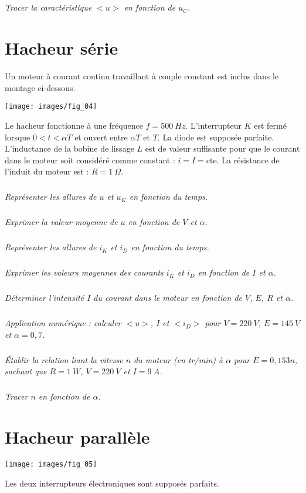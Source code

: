 \documentclass[10pt,fleqn]{article} %
\begin{document}
\begin{multicols}{2}
\begin{multicols}{2}
\subparagraph{}\textit{Tracer la caractéristique $< u >$ en fonction de $u_C$.}



\newpage

\section*{Hacheur série}

\setcounter{exo}{0}
Un moteur à courant continu travaillant à couple constant est inclus dans le montage ci-dessous.


\begin{center}
\texttt{[image: images/fig\_04]}
\end{center}


Le hacheur fonctionne à une fréquence $f = \SI{500}{Hz}$.
L’interrupteur $K$ est fermé lorsque $0 < t < \alpha T$ et ouvert entre $\alpha T$ et $T$.
La diode est supposée parfaite.
L'inductance de la bobine de lissage $L$ est de valeur suffisante pour que le courant dans le
moteur soit considéré comme constant : $i= I = \text{cte}$.
La résistance de l’induit du moteur est : $R = \SI{1}{\Omega}$.

\subparagraph{}\textit{ Représenter les allures de $u$ et $u_K$ en fonction du temps.}
\subparagraph{}\textit{ Exprimer la valeur moyenne de $u$ en fonction de $V$ et $\alpha$.}
\subparagraph{}\textit{ Représenter les allures de $i_K$ et $i_D$ en fonction du temps.}
\subparagraph{}\textit{ Exprimer les valeurs moyennes des courants $i_K$ et $i_D$ en fonction de $I$ et $\alpha$.}
\subparagraph{}\textit{ Déterminer l'intensité $I$ du courant dans le moteur en fonction de $V$, $E$, $R$ et $\alpha$.}

\subparagraph{}\textit{ Application numérique : calculer $< u >$, $I$ et $< i_D >$ pour $V = \SI{220}{V}$, $E = \SI{145}{V}$ et $\alpha = 0,7$.}

\subparagraph{}\textit{ Établir la relation liant la vitesse $n$ du moteur (en tr/min) à $\alpha$ pour $E = 0,153 n$, sachant que $R = \SI{1}{W}$, $V = \SI{220}{V}$ et $I =\SI{9}{A}$.}
\subparagraph{}\textit{ Tracer $n$ en fonction de $\alpha$.}

\newpage

\section*{Hacheur parallèle}
\setcounter{exo}{0}

\begin{center}
\texttt{[image: images/fig\_05]}
\end{center}
Les deux interrupteurs électroniques sont supposés parfaits.



\end{multicols}
\end{multicols}
\end{document}
